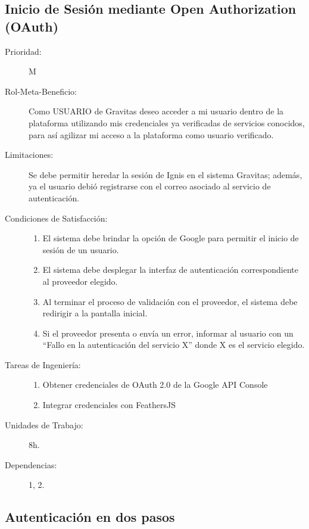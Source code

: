 \newpage


\subsection{Inicio de Sesión mediante Open Authorization (OAuth)}

\begin{description}
    \item[Prioridad:] M
    \item[Rol-Meta-Beneficio:] Como USUARIO de Gravitas deseo acceder a mi usuario dentro de la plataforma utilizando mis credenciales ya verificadas de servicios conocidos, para así agilizar mi acceso a la plataforma como usuario verificado.
    \item[Limitaciones:] Se debe permitir heredar la sesión de Ignis en el sistema Gravitas; además, ya el usuario debió registrarse con el correo asociado al servicio de autenticación.
    \item[Condiciones de Satisfacción:] \hfill
        \begin{enumerate}
            \item El sistema debe brindar la opción de Google para permitir el inicio de sesión de un usuario.
            \item El sistema debe desplegar la interfaz de autenticación correspondiente al proveedor elegido.
            \item Al terminar el proceso de validación con el proveedor, el sistema debe redirigir a la pantalla inicial.
            \item Si el proveedor presenta o envía un error, informar al usuario con un “Fallo en la autenticación del servicio X” donde X es el servicio elegido.
        \end{enumerate}
    \item[Tareas de Ingeniería:] \hfill
        \begin{enumerate}
            \item Obtener credenciales de OAuth 2.0 de la Google API Console
            \item Integrar credenciales con FeathersJS
        \end{enumerate}
    \item[Unidades de Trabajo:] 8h.
    \item[Dependencias:] 1, 2.
\end{description}

\newpage

\subsection{Autenticación en dos pasos}

